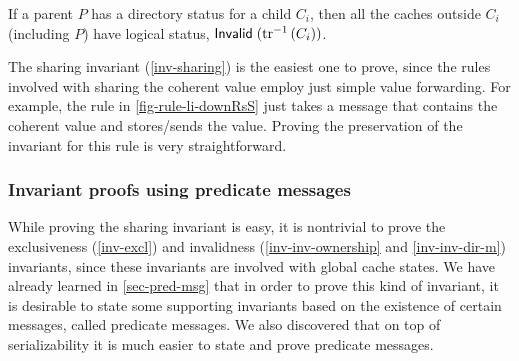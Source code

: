 \begin{invariant}
  \label{inv-inv-dir-m}
  If a parent $P$ has a directory status \stM{} for a child $C_i$, then all the caches outside $C_i$ (including $P$) have logical \stI{} status, \ie{} $\textsf{Invalid}\;(\textrm{tr}^{-1}\,(C_i))$.
\end{invariant}

The sharing invariant (\autoref{inv-sharing}) is the easiest one to prove, since the rules involved with sharing the coherent value employ just simple value forwarding.
For example, the rule in \autoref{fig-rule-li-downRsS} just takes a message  that contains the coherent value and stores/sends the value.
Proving the preservation of the invariant for this rule is very straightforward.

\subsubsection{Invariant proofs using predicate messages}

While proving the sharing invariant is easy, it is nontrivial to prove the exclusiveness (\autoref{inv-excl}) and invalidness (\autoref{inv-inv-ownership} and \autoref{inv-inv-dir-m}) invariants, since these invariants are involved with global cache states.
We have already learned in \autoref{sec-pred-msg} that in order to prove this kind of invariant, it is desirable to state some supporting invariants based on the existence of certain messages, called predicate messages.
We also discovered that on top of serializability it is much easier to state and prove predicate messages.


